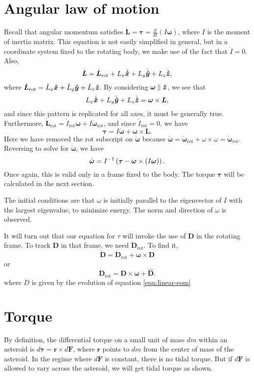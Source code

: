 \documentclass[aps,twocolumn,secnumarabic,balancelastpage,amsmath,amssymb,nofootinbib,floatfix]{revtex4-1}
\begin{document}
\section{Angular law of motion}
Recall that angular momentum satisfies $ \dot{\bm L} = \bm \tau = \frac{d}{dt}(I \bm \omega)$,
where $I$ is the moment of inertia matrix. This equation is not easily simplified in general, but in a coordinate system fixed to the rotating body, we make use of the fact that $\dot I = 0$. Also,
$$\dot{\bm L} = \dot{\bm L}_\text{rot} + L_x \dot{\bm{\hat x}} + L_y \dot{\bm{\hat y}} + L_z \dot{\bm{\hat z}},$$
where $\dot{\bm L}_\text{rot} = \dot L_x \bm{\hat x} + \dot L_y \bm{\hat y} + \dot L_z \bm{\hat z}$. By considering $\bm\omega \parallel \bm{\hat z}$, we see that
$$L_x \dot{\bm{\hat x}} + L_y \dot{\bm{\hat y}} + L_z \dot{\bm{\hat z}} = \bm\omega \times \bm L,$$
and since this pattern is replicated for all axes, it must be generally true. Furthermore, $\dot{\bm L}_\text{rot} = \dot I_\text{rot} \bm \omega + I \dot{\bm \omega}_\text{rot}$, and since $\dot I_\text{rot} = 0$, we have
$$\bm \tau = I \dot{\bm \omega} + \bm\omega \times \bm L.$$
Here we have removed the rot subscript on $\dot{\bm \omega}$ because $\dot{\bm \omega} = \dot{\bm \omega}_\text{rot} + \omega \times \omega =  \dot{\bm \omega}_\text{rot}.$ Reversing to solve for $\dot{\bm \omega}$, we have
\begin{equation}
\dot{\bm \omega} = I^{-1}\left( \bm \tau - \bm \omega \times (I \bm \omega) \right).
\label{eqn:euler}
\end{equation}
Once again, this is valid only in a frame fixed to the body. The torque $\bm \tau$ will be calculated in the next section.

The initial conditions are that $\omega$ is initially parallel to the eigenvector of $I$ with the largest eigenvalue, to minimize energy. The norm and direction of $\omega$ is observed.

It will turn out that our equation for $\tau$ will invoke the use of $\bm D$ in the rotating frame. To track $\bm D$ in that frame, we need $\dot{\bm D}_\text{rot}$. To find it,
$$\dot{\bm D} = \dot{\bm D}_\text{rot} + \bm \omega \times \bm D$$
or
\begin{equation}
\dot{\bm D}_\text{rot} = \bm D \times \bm \omega + \hat{\bm D}.
\label{eqn:d-eom}
\end{equation}
where $\dot D$ is given by the evolution of equation \ref{eqn:linear-eom}

\section{Torque}
By definition, the differential torque on a small unit of mass $dm$ within an asteroid is $d\bm \tau = \bm r \times d\bm F$, where $\bm r$ points to $dm$ from the center of mass of the asteroid. In the regime where $d\bm F$ is constant, there is no tidal torque. But if $d\bm F$ is allowed to vary across the asteroid, we will get tidal torque as shown.
\end{document}
